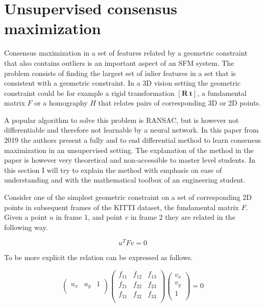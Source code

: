 \section{Unsupervised consensus maximization}

Consensus maximization in a set of features related by a geometric constraint that also contains outliers is an important aspect of an SFM system. The problem consists of finding the largest set of inlier features in a set that is consistent with a geometric constraint. In a 3D vision setting the geometric constraint could be for example a rigid transformation $[\textbf{R}\ \textbf{t}]$, a fundamental matrix $F$ or a homography $H$ that relates pairs of corresponding 3D or 2D points.

A popular algorithm to solve this problem is RANSAC\cite{ransac}, but is however not differentiable and therefore not learnable by a neural network. In this paper\cite{consensus} from 2019 the authors present a fully and to end differential method to learn consensus maximization in an unsupervised setting. The explanation  of the method in the paper is however very theoretical and non-accessible to master level students. In this section I will try to explain the method with emphasis on ease of understanding and with the mathematical toolbox of an engineering student.

Consider one of the simplest geometric constraint on a set of corresponding 2D points in subsequent frames of the KITTI dataset, the fundamental matrix $F$. Given a point $u$ in frame 1, and point $v$ in frame 2 they are related in the following way.

 \[
 u^T F v = 0
 \]
 
 To be more explicit the relation can be expressed as follows.
 
\[
\begin{pmatrix}
u_x & u_y & 1 \\
\end{pmatrix}
\begin{pmatrix}
f_{11} & f_{12} & f_{13} \\
f_{21} & f_{22} & f_{23} \\
f_{31} & f_{32} & f_{33} \\
\end{pmatrix}
\begin{pmatrix}
v_x \\
v_y \\
1 \\
\end{pmatrix}
= 0
\]

